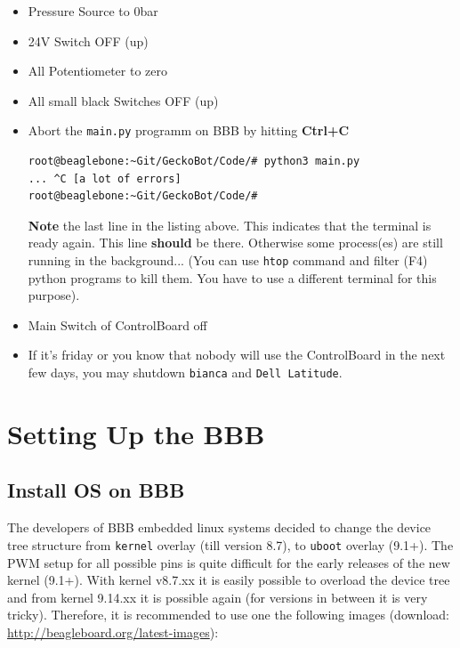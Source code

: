 \documentclass[
	fontsize=10pt
	paper=a4
]{scrartcl}
\begin{document}
\begin{itemize}
\item Pressure Source to 0bar
\item 24V Switch OFF (up)
\item All Potentiometer to zero
\item All small black Switches OFF (up)


\item Abort the \texttt{main.py} programm on BBB by hitting \textbf{Ctrl+C}
\begin{lstlisting}
root@beaglebone:~Git/GeckoBot/Code/# python3 main.py
... ^C [a lot of errors]
root@beaglebone:~Git/GeckoBot/Code/#
\end{lstlisting}

\textbf{Note} the last line in the listing above. This indicates that the terminal is ready again. This line \textbf{should} be there. Otherwise some process(es) are still running in the background... (You can use \texttt{htop} command and filter (F4) python programs to kill them. You have to use a different terminal for this purpose).

\item Main Switch of ControlBoard off

\item If it's friday or you know that nobody will use the ControlBoard in the next few days, you may shutdown \texttt{bianca} and \texttt{Dell Latitude}.

\end{itemize}




\clearpage
\section{Setting Up the BBB}




\subsection{Install OS on BBB}

The developers of BBB embedded linux systems decided to change the device tree structure from \texttt{kernel} overlay (till version 8.7), to \texttt{uboot} overlay (9.1+).
The PWM setup for all possible pins is quite difficult for the early releases of the new kernel (9.1+).
With kernel v8.7.xx it is easily possible to overload the device tree and from kernel 9.14.xx it is possible again (for versions in between it is very tricky).
Therefore, it is recommended to use one the following images (download: \url{http://beagleboard.org/latest-images}):
\end{document}
